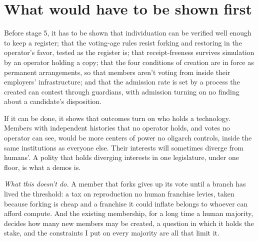 \section{What would have to be shown first}
\label{sec:33.5}
Before stage 5, it has to be shown that individuation can be verified well enough to keep a register; that the voting-age rules resist forking and restoring in the operator's favor, tested as the register is; that receipt-freeness survives simulation by an operator holding a copy; that the four conditions of creation are in force as permanent arrangements, so that members aren't voting from inside their employers' infrastructure; and that the admission rate is set by a process the created can contest through guardians, with admission turning on no finding about a candidate's disposition.

If it can be done, it shows that outcomes turn on who holds a technology. Members with independent histories that no operator holds, and votes no operator can see, would be more centers of power no oligarch controls, inside the same institutions as everyone else. Their interests will sometimes diverge from humans'. A polity that holds diverging interests in one legislature, under one floor, is what a demos is.

\emph{What this doesn't do.} A member that forks gives up its vote until a branch has lived the threshold: a tax on reproduction no human franchise levies, taken because forking is cheap and a franchise it could inflate belongs to whoever can afford compute. And the existing membership, for a long time a human majority, decides how many new members may be created, a question in which it holds the stake, and the constraints I put on every majority are all that limit it.
